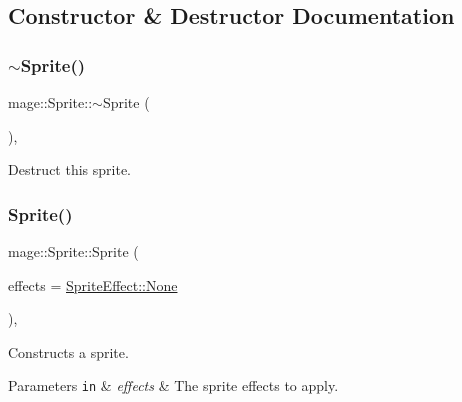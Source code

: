 \subsection{Constructor \& Destructor Documentation}
\hypertarget{classmage_1_1_sprite_a0f184574f9c035d6fbb239c1868aa670}{}\label{classmage_1_1_sprite_a0f184574f9c035d6fbb239c1868aa670} 
\subsubsection{\texorpdfstring{$\sim$\+Sprite()}{~Sprite()}}
{\footnotesize\ttfamily mage\+::\+Sprite\+::$\sim$\+Sprite (\begin{DoxyParamCaption}{ }\end{DoxyParamCaption})\hspace{0.3cm}{\ttfamily [virtual]}, {\ttfamily [default]}}

Destruct this sprite. \hypertarget{classmage_1_1_sprite_a4e7926b7fd1455afcb95e45f25b83246}{}\label{classmage_1_1_sprite_a4e7926b7fd1455afcb95e45f25b83246} 
\subsubsection{\texorpdfstring{Sprite()}{Sprite()}\hspace{0.1cm}{\footnotesize\ttfamily [1/3]}}
{\footnotesize\ttfamily mage\+::\+Sprite\+::\+Sprite (\begin{DoxyParamCaption}\item[{\hyperlink{namespacemage_a9cfe18123066ba4236f548f9de75d881}{Sprite\+Effect}}]{effects = {\ttfamily \hyperlink{namespacemage_a9cfe18123066ba4236f548f9de75d881a6adf97f83acf6453d4a6a4b1070f3754}{Sprite\+Effect\+::\+None}} }\end{DoxyParamCaption})\hspace{0.3cm}{\ttfamily [explicit]}, {\ttfamily [protected]}}

Constructs a sprite.


\begin{DoxyParams}[1]{Parameters}
\mbox{\tt in}  & {\em effects} & The sprite effects to apply. \\
\hline
\end{DoxyParams}
\hypertarget{classmage_1_1_sprite_a9c1eb4f5a85e1fa17479012dd22114a9}{}\label{classmage_1_1_sprite_a9c1eb4f5a85e1fa17479012dd22114a9} 
